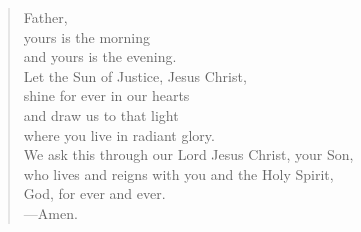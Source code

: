 \prayer

\setlength{\leftmargini}{\prayerleftmargini}

\begin{verse}
Father,\\
yours is the morning\\
and yours is the evening.\\
Let the Sun of Justice, Jesus Christ,\\
shine for ever in our hearts\\
and draw us to that light\\
where you live in radiant glory.\\
We ask this through our Lord Jesus Christ, your Son,\\
who lives and reigns with you and the Holy Spirit,\\
God, for ever and ever.\\
{\color{red}---\thinspace}Amen.
\end{verse}

\setlength{\leftmargini}{\defleftmargini}